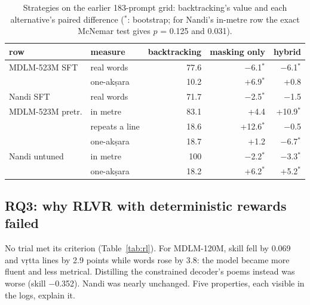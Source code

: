 \documentclass[11pt]{article}
\newcommand{\sig}{$^{\ast}$}
\begin{document}
\begin{table}[t]
\centering\scriptsize\setlength{\tabcolsep}{2.8pt}
\begin{tabular}{@{}llrrr@{}}
\toprule
row & measure & backtracking & masking only & hybrid \\
\midrule
MDLM-523M SFT & real words & 77.6 & $-$6.1\sig & $-$6.1\sig \\
 & one-akṣara & 10.2 & +6.9\sig & +0.8 \\
Nandi SFT & real words & 71.7 & $-$2.5\sig & $-$1.5 \\
MDLM-523M pretr. & in metre & 83.1 & +4.4 & +10.9\sig \\
 & repeats a line & 18.6 & +12.6\sig & $-$0.5 \\
 & one-akṣara & 18.7 & +1.2 & $-$6.7\sig \\
Nandi untuned & in metre & 100 & $-$2.2\sig & $-$3.3\sig \\
 & one-akṣara & 18.2 & +6.2\sig & +5.2\sig \\
\bottomrule
\end{tabular}
\caption{Strategies on the earlier 183-prompt grid: backtracking's value and each alternative's paired difference
(\sig: bootstrap; for Nandi's in-metre row the exact McNemar test gives $p$ = 0.125 and 0.031).}
\label{tab:strategies}
\end{table}

\subsection{RQ3: why RLVR with deterministic rewards failed}\label{sec:rq3}

No trial met its criterion (Table~\ref{tab:rl}). For MDLM-120M, skill fell by 0.069 and vṛtta lines by 2.9
points while words rose by 3.8: the model became more fluent and less metrical. Distilling the constrained
decoder's poems instead was worse (skill $-$0.352). Nandi was nearly unchanged. Five properties, each visible
in the logs, explain it.
\end{document}
